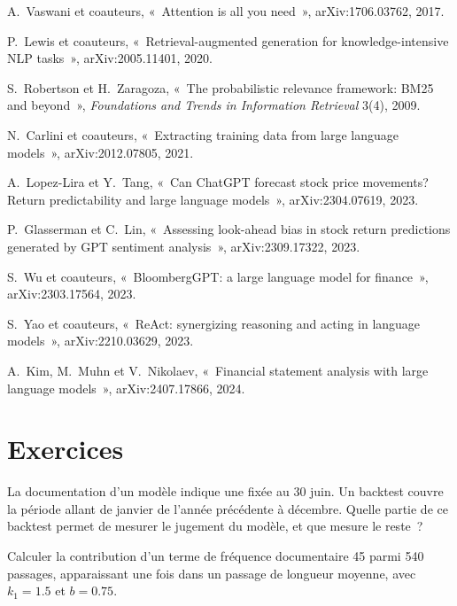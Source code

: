 \begin{omsources}
\item A.~Vaswani et coauteurs, «~Attention is all you need~», arXiv:1706.03762, 2017.
\item P.~Lewis et coauteurs, «~Retrieval-augmented generation for knowledge-intensive NLP tasks~», arXiv:2005.11401, 2020.
\item S.~Robertson et H.~Zaragoza, «~The probabilistic relevance framework: BM25 and beyond~», \emph{Foundations and Trends
in Information Retrieval} 3(4), 2009.
\item N.~Carlini et coauteurs, «~Extracting training data from large language models~», arXiv:2012.07805, 2021.
\item A.~Lopez-Lira et Y.~Tang, «~Can ChatGPT forecast stock price movements? Return predictability and large language
models~», arXiv:2304.07619, 2023.
\item P.~Glasserman et C.~Lin, «~Assessing look-ahead bias in stock return predictions generated by GPT sentiment
analysis~», arXiv:2309.17322, 2023.
\item S.~Wu et coauteurs, «~BloombergGPT: a large language model for finance~», arXiv:2303.17564, 2023.
\item S.~Yao et coauteurs, «~ReAct: synergizing reasoning and acting in language models~», arXiv:2210.03629, 2023.
\item A.~Kim, M.~Muhn et V.~Nikolaev, «~Financial statement analysis with large language models~», arXiv:2407.17866, 2024.
\end{omsources}

\section{Exercices}

\begin{exercise}[$\star$]\label{exo:ml:large-language-models-in-finance:1}
La documentation d'un modèle indique une  fixée au 30 juin. Un backtest couvre la période allant de janvier de l'année précédente à décembre.
Quelle partie de ce backtest permet de mesurer le jugement du modèle, et que mesure le reste~?
\end{exercise}

\begin{exercise}[$\star$]\label{exo:ml:large-language-models-in-finance:2}
Calculer la contribution  d'un terme de fréquence documentaire 45 parmi 540 passages, apparaissant une fois dans un passage de
longueur moyenne, avec $k_1 = 1.5$ et $b = 0.75$.
\end{exercise}

